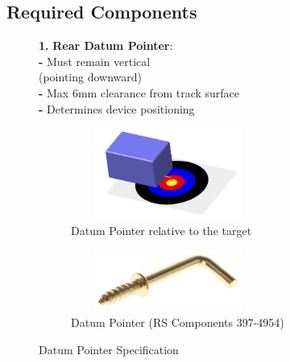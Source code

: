 \documentclass{article}
\newcommand{\wm}[2]{%
	\begin{minipage}{#1\textwidth}
		\centering
		#2
	\end{minipage}%
}
\begin{document}
\subsection{Required Components}
\begin{itemize}[itemsep=-0.7mm]
	
	\begin{figure}[H]
	\begin{minipage}{0.4\textwidth}	
	\centering\wm{0.8}{
	\item[\textbf{1.}] \textbf{Rear Datum Pointer}:\\
		\textbf{-} Must remain vertical\\ 
		(pointing downward)\\
		\textbf{-} Max 6mm clearance from track surface\\
		\textbf{-} Determines device positioning
	}
	\end{minipage}\hspace{-2em}
	\begin{minipage}{0.7\textwidth}	
		\centering
		\begin{subfigure}[t]{0.45\textwidth}
			\centering
			\includegraphics[width=0.7\textwidth,height=3cm]{extracted_images/image_10_2.png}
			\caption{Datum Pointer relative to the target}
			\label{fig:datumall}
		\end{subfigure}\hspace*{1em}
		\begin{subfigure}[t]{0.45\textwidth}
			\centering
			\includegraphics[width=0.7\textwidth,height=2cm]{extracted_images/image_10_1.png}
			\caption{Datum Pointer (RS Components 397-4954)}
			\label{fig:datum}
		\end{subfigure}
		\caption{Datum Pointer Specification}
	\end{minipage}
	\end{figure}


\end{itemize}
\end{document}
